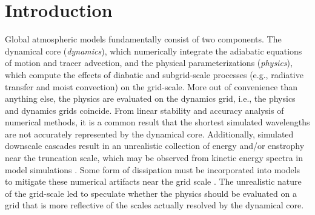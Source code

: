 \documentclass{agujournal}
\begin{document}



\section{Introduction}\label{sec:intro}

Global atmospheric models fundamentally consist of two components. The dynamical core ({\em{dynamics}}), which numerically integrate the adiabatic equations of motion and tracer advection, and the physical parameterizations ({\em{physics}}), which compute the effects of diabatic and subgrid-scale processes (e.g., radiative transfer and moist convection) on the grid-scale. More out of convenience than anything else, the physics are evaluated on the dynamics grid, i.e., the physics and dynamics grids coincide. From linear stability and accuracy analysis of numerical methods, it is a common result that the shortest simulated wavelengths are not accurately represented by the dynamical core. Additionally, simulated downscale cascades result in an unrealistic collection of energy and/or enstrophy near the truncation scale, which may be observed from kinetic energy spectra in model simulations \citep{S2011LNCSE}. Some form of dissipation must be incorporated into models to mitigate these numerical artifacts near the grid scale \citep{JW2010LNCSE}. The unrealistic nature of the grid-scale led \cite{LH1997MWR} to speculate whether the physics should be evaluated on a grid that is more reflective of the scales actually resolved by the dynamical core.
\end{document}
